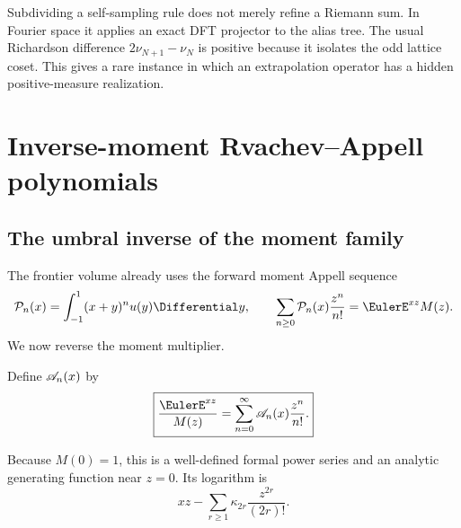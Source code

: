 \documentclass[11pt,oneside]{article}
\numberwithin{equation}{section}
\theoremstyle{definition}
\theoremstyle{remark}
\begin{document}
\begin{resultbox}
Subdividing a self-sampling rule does not merely refine a Riemann sum.  In Fourier space it applies an exact DFT projector to the alias tree.  The usual Richardson difference $2\nu_{N+1}-\nu_N$ is positive because it isolates the odd lattice coset.  This gives a rare instance in which an extrapolation operator has a hidden positive-measure realization.
\end{resultbox}

\section{Inverse-moment Rvachev--Appell polynomials}
\label{p3:sec:appell}

\subsection{The umbral inverse of the moment family}

The frontier volume already uses the forward moment Appell sequence
\begin{equation}
 \Pcal_n(x)=\int_{-1}^{1}(x+y)^n u(y)\Differential y,
 \qquad
 \sum_{n\ge0}\Pcal_n(x)\frac{z^n}{n!}=\EulerE^{xz}M(z).
 \label{p3:eq:forward-Appell}
\end{equation}
We now reverse the moment multiplier.

\begin{definition}
\label{p3:def:inverse-Appell}
Define $\mathscr A_n(x)$ by
\begin{equation}
 \boxed{\displaystyle
 \frac{\EulerE^{xz}}{M(z)}
 =\sum_{n=0}^{\infty}\Acal_n(x)\frac{z^n}{n!}.}
 \label{p3:eq:inverse-Appell-gen}
\end{equation}
\end{definition}

Because $M(0)=1$, this is a well-defined formal power series and an analytic generating function near $z=0$.  Its logarithm is
\begin{equation}
 xz-\sum_{r\ge1}\kappa_{2r}\frac{z^{2r}}{(2r)!}.
 \label{p3:eq:inverse-Appell-log}
\end{equation}
\end{document}
